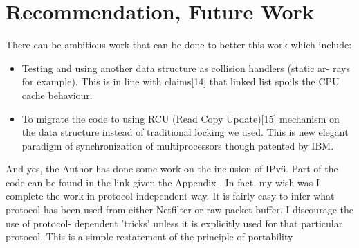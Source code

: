 \chapter{Recommendation, Future Work}
There can be ambitious work that can be done to better this work which include:
\begin{itemize}
\item Testing and using another data structure as collision handlers (static ar-
rays for example). This is in line with claims[14] that linked list spoils
the CPU cache behaviour.
\item To migrate the code to using RCU (Read Copy Update)[15] mechanism
on the data structure instead of traditional locking we used. This is new
elegant paradigm of synchronization of multiprocessors though patented
by IBM.
\end{itemize}
And yes, the Author has done some work on the inclusion of IPv6. Part of the code
can be found in the link given the Appendix . In fact, my wish was I complete the
work in protocol independent way. It is fairly easy to infer what protocol has been
used from either Netfilter or raw packet buffer. I discourage the use of protocol-
dependent 'tricks' unless it is explicitly used for that particular protocol. This is a
simple restatement of the principle of portability

